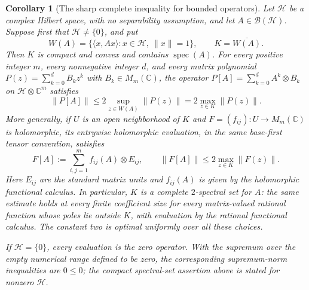 \documentclass[11pt]{article}
\newcommand{\C}{\mathbb C}
\DeclareMathOperator{\spec}{spec}
\newtheorem{corollary}[theorem]{Corollary}
\theoremstyle{definition}
\theoremstyle{remark}
\numberwithin{equation}{section}
\begin{document}
\begin{corollary}[The sharp complete inequality for bounded operators]\label{cor:hilbert}
Let $\mathcal H$ be a complex Hilbert space, with no separability assumption,
and let $A\in\mathcal B(\mathcal H)$. Suppose first that
$\mathcal H\ne\{0\}$, and put
\[
 W(A)=\{\langle x,Ax\rangle:x\in\mathcal H,\ \|x\|=1\},
 \qquad K=\overline{W(A)}.
\]
Then $K$ is compact and convex and contains $\spec(A)$. For every positive
integer $m$, every nonnegative integer $d$, and every matrix polynomial
$P(z)=\sum_{k=0}^d B_kz^k$ with $B_k\in M_m(\C)$, the operator
$P[A]=\sum_{k=0}^d A^k\otimes B_k$ on $\mathcal H\otimes\C^m$ satisfies
\begin{equation}\label{eq:hilbert-polynomial}
 \|P[A]\|\le 2\sup_{z\in W(A)}\|P(z)\|
             =2\max_{z\in K}\|P(z)\|.
\end{equation}
More generally, if $U$ is an open neighborhood of $K$ and
$F=(f_{ij}):U\to M_m(\C)$ is holomorphic, its entrywise holomorphic
evaluation, in the same base-first tensor convention, satisfies
\begin{equation}\label{eq:hilbert-holomorphic}
 F[A]:=\sum_{i,j=1}^m f_{ij}(A)\otimes E_{ij},
 \qquad \|F[A]\|\le2\max_{z\in K}\|F(z)\|.
\end{equation}
Here $E_{ij}$ are the standard matrix units and $f_{ij}(A)$ is given by the
holomorphic functional calculus. In particular, $K$ is a complete
$2$-spectral set for $A$: the same estimate holds at every finite coefficient
size for every matrix-valued rational function whose poles lie outside $K$,
with evaluation by the rational functional calculus. The constant two is
optimal uniformly over all these choices.

If $\mathcal H=\{0\}$, every evaluation is the zero operator. With the
supremum over the empty numerical range defined to be zero, the corresponding
supremum-norm inequalities are $0\le0$; the compact spectral-set assertion
above is stated for nonzero $\mathcal H$.
\end{corollary}
\end{document}
